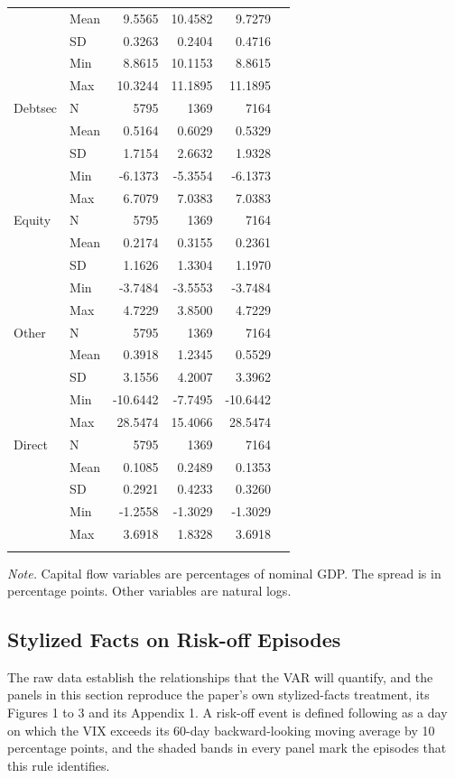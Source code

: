 \begin{longtable}{@{}l l r r r r@{}}
 & Mean & 9.5565 & 10.4582 & 9.7279 \\
 & SD & 0.3263 & 0.2404 & 0.4716 \\
 & Min & 8.8615 & 10.1153 & 8.8615 \\
 & Max & 10.3244 & 11.1895 & 11.1895 \\
\addlinespace
Debtsec & N & 5795 & 1369 & 7164 \\
 & Mean & 0.5164 & 0.6029 & 0.5329 \\
 & SD & 1.7154 & 2.6632 & 1.9328 \\
 & Min & -6.1373 & -5.3554 & -6.1373 \\
 & Max & 6.7079 & 7.0383 & 7.0383 \\
\addlinespace
Equity & N & 5795 & 1369 & 7164 \\
 & Mean & 0.2174 & 0.3155 & 0.2361 \\
 & SD & 1.1626 & 1.3304 & 1.1970 \\
 & Min & -3.7484 & -3.5553 & -3.7484 \\
 & Max & 4.7229 & 3.8500 & 4.7229 \\
\addlinespace
Other & N & 5795 & 1369 & 7164 \\
 & Mean & 0.3918 & 1.2345 & 0.5529 \\
 & SD & 3.1556 & 4.2007 & 3.3962 \\
 & Min & -10.6442 & -7.7495 & -10.6442 \\
 & Max & 28.5474 & 15.4066 & 28.5474 \\
\addlinespace
Direct & N & 5795 & 1369 & 7164 \\
 & Mean & 0.1085 & 0.2489 & 0.1353 \\
 & SD & 0.2921 & 0.4233 & 0.3260 \\
 & Min & -1.2558 & -1.3029 & -1.3029 \\
 & Max & 3.6918 & 1.8328 & 3.6918 \\
\addlinespace
  \bottomrule
\end{longtable}

\begin{center}
  \small\textit{Note.} Capital flow variables are percentages of nominal GDP. The spread is in percentage points. Other variables are natural logs.
\end{center}

\subsection{Stylized Facts on Risk-off Episodes}

The raw data establish the relationships that the VAR will quantify, and the panels in this section reproduce the paper's own stylized-facts treatment, its Figures 1 to 3 and its Appendix 1. A risk-off event is defined following \textcite{debock_carvalhofilho_2013} as a day on which the VIX exceeds its 60-day backward-looking moving average by 10 percentage points, and the shaded bands in every panel mark the episodes that this rule identifies.

